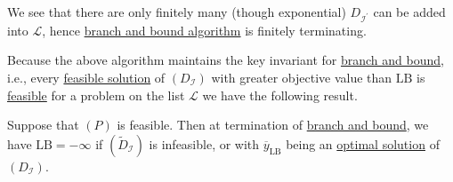 \begin{remark}
	We see that there are only finitely many (though exponential) \(D_{\mathcal{I} ^\prime}\) can be added into \(\mathcal{L} \),
	hence \hyperref[algo:branch-and-bound-algorithm]{branch and bound algorithm} is finitely terminating.
\end{remark}

Because the above algorithm maintains the key invariant for \hyperref[algo:branch-and-bound-algorithm]{branch and bound}, i.e.,
every \hyperref[def:feasible-solution]{feasible solution} of \((D_{\mathcal{I} } )\) with greater objective value
than \(\mathrm{LB}\) is \hyperref[def:feasible-solution]{feasible} for a problem on the list \(\mathcal{L} \) we
have the following result.
\begin{theorem}\label{thm:lec23-1}
	Suppose that \((P)\) is feasible. Then at termination of \hyperref[algo:branch-and-bound-algorithm]{branch and bound}, we have
	\(\mathrm{LB}=-\infty\) if \((\widetilde{D} _\mathcal{I})\) is infeasible, or with \(\overline{y} _{\mathrm{LB}}\)
	being an \hyperref[def:optimal-solution]{optimal solution} of \((D_{\mathcal{I} } )\).
\end{theorem}

